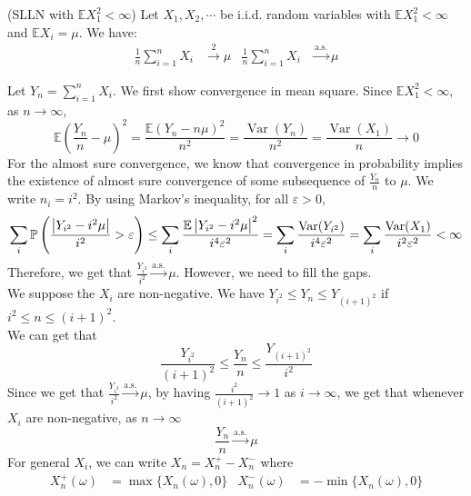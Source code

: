 \documentclass{huhtakm-template-book}
\newcommand{\prob}{\mathbb{P}}
\newcommand{\expect}{\mathbb{E}}
\DeclareMathOperator{\Var}{Var}
\begin{document}
\begin{thm}(SLLN with $\expect X_{1}^{2}<\infty$) Let $X_{1},X_{2},\cdots$ be i.i.d. random variables with $\expect X_{1}^{2}<\infty$ and $\expect X_{i}=\mu$. We have:
	\begin{align*}
		\frac{1}{n}\sum_{i=1}^{n}X_{i}&\xrightarrow{2}\mu & \frac{1}{n}\sum_{i=1}^{n}X_{i}&\xrightarrow{\text{a.s.}}\mu
	\end{align*}
\end{thm}
\begin{proofing}
	Let $Y_{n}=\sum_{i=1}^{n}X_{i}$. We first show convergence in mean square. Since $\expect X_{1}^{2}<\infty$, as $n\to\infty$,
	\begin{equation*}
		\expect\left(\frac{Y_{n}}{n}-\mu\right)^{2}=\frac{\expect(Y_{n}-n\mu)^{2}}{n^{2}}=\frac{\Var(Y_{n})}{n^{2}}=\frac{\Var(X_{1})}{n}\to 0
	\end{equation*}
	For the almost sure convergence, we know that convergence in probability implies the existence of almost sure convergence of some subsequence of $\frac{Y_{n}}{n}$ to $\mu$. We write $n_{i}=i^{2}$. By using Markov's inequality, for all $\varepsilon>0$,
	\begin{equation*}
		\sum_{i}\prob\left(\frac{\abs{Y_{i^{2}}-i^{2}\mu}}{i^{2}}>\varepsilon\right)\leq\sum_{i}\frac{\expect\abs{Y_{i^{2}}-i^{2}\mu}^{2}}{i^{4}\varepsilon^{2}}=\sum_{i}\frac{\Var(Y_{i^{2}})}{i^{4}\varepsilon^{2}}=\sum_{i}\frac{\Var(X_{1})}{i^{2}\varepsilon^{2}}<\infty
	\end{equation*}
	Therefore, we get that $\frac{Y_{i^{2}}}{i^{2}}\xrightarrow{\text{a.s.}}\mu$. However, we need to fill the gaps.\\
	We suppose the $X_{i}$ are non-negative. We have $Y_{i^{2}}\leq Y_{n}\leq Y_{(i+1)^{2}}$ if $i^{2}\leq n\leq (i+1)^{2}$.\\
	We can get that
	\begin{equation*}
		\frac{Y_{i^{2}}}{(i+1)^{2}}\leq\frac{Y_{n}}{n}\leq\frac{Y_{(i+1)^{2}}}{i^{2}}
	\end{equation*}
	Since we get that $\frac{Y_{i^{2}}}{i^{2}}\xrightarrow{\text{a.s.}}\mu$, by having $\frac{i^{2}}{(i+1)^{2}}\to 1$ as $i\to\infty$, we get that whenever $X_{i}$ are non-negative, as $n\to\infty$
	\begin{equation*}
		\frac{Y_{n}}{n}\xrightarrow{\text{a.s.}}\mu
	\end{equation*}
	For general $X_{i}$, we can write $X_{n}=X_{n}^{+}-X_{n}^{-}$ where
	\begin{align*}
		X_{n}^{+}(\omega)&=\max\{X_{n}(\omega),0\} & X_{n}^{-}(\omega)&=-\min\{X_{n}(\omega),0\}

\end{align*}
\end{proofing}
\end{document}

